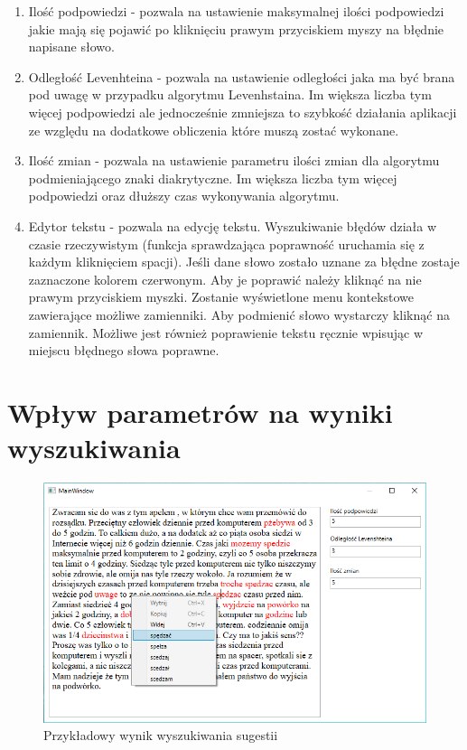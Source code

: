 \begin{enumerate}
	\item Ilość podpowiedzi - pozwala na ustawienie maksymalnej ilości podpowiedzi jakie mają się pojawić po kliknięciu prawym przyciskiem myszy na błędnie napisane słowo.
	\item Odległość Levenhteina - pozwala na ustawienie odległości jaka ma być brana pod uwagę w przypadku algorytmu Levenhstaina. Im większa liczba tym więcej podpowiedzi ale jednocześnie zmniejsza to szybkość działania aplikacji ze względu na dodatkowe obliczenia które muszą zostać wykonane. 
	\item Ilość zmian - pozwala na ustawienie parametru ilości zmian dla algorytmu podmieniającego znaki diakrytyczne. Im większa liczba tym więcej podpowiedzi oraz dłuższy czas wykonywania algorytmu.
	\item Edytor tekstu - pozwala na edycję tekstu. Wyszukiwanie błędów działa w czasie rzeczywistym (funkcja sprawdzająca poprawność uruchamia się z każdym kliknięciem spacji). Jeśli dane słowo zostało uznane za błędne zostaje zaznaczone kolorem czerwonym. Aby je poprawić należy kliknąć na nie prawym przyciskiem myszki. Zostanie wyświetlone menu kontekstowe zawierające możliwe zamienniki. Aby podmienić słowo wystarczy kliknąć na zamiennik. Możliwe jest również poprawienie tekstu ręcznie wpisując w miejscu błędnego słowa poprawne. 
	
\end{enumerate}

\section{Wpływ parametrów na wyniki wyszukiwania}

\begin{figure} [H]
	\centering
	\includegraphics[width=1\linewidth]{rozdzial03/screen2.png}
	\caption{Przykładowy wynik wyszukiwania sugestii}
	\label{fig:interfejs1}
\end{figure}

